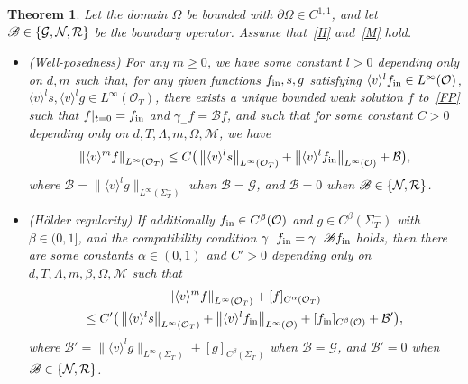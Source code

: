 \documentclass[10pt]{amsart}
\newtheorem{theo}{Theorem}[section]
\theoremstyle{definition}\newtheorem{defi}[theo]{Definition}\newtheorem{rema}[theo]{Remark}\newtheorem{exam}[theo]{Example}\newtheorem{exem}[theo]{Example}\newtheorem{nota}[theo]{Notation}
\newcommand*\p{\partial}
\newcommand*\fin {f_{\rm in}}
\newcommand*\M {{\mathcal{M}}}
\newcommand*\NN {{\mathcal{N}\hspace{-.3mm}}}
\newcommand*\Gi {\mathcal{G}}
\newcommand*\BB {\mathscr{B}}
\newcommand{\clB}{\mathcal{B}}
\newcommand*\RR {\mathcal{R}}
\newcommand*\OO {\mathcal{O}}
\newcommand{\lv}{\langle v\rangle}
\begin{document}
\begin{theo}\label{thm}
Let the domain $\Omega$ be bounded with $\p\Omega\in C^{1,1}$, and let $\BB\in\{\Gi,\NN,\RR\}$ be the boundary operator. Assume that~\eqref{H} and~\eqref{M} hold. \vspace{-2.5mm}
\begin{itemize}
\item(Well-posedness) For any $m\ge0$, we have some constant $l>0$ depending only on $d,m$ such that, for any given functions $\fin,s,g$ satisfying $\lv^l\fin\in L^\infty(\OO)$, $\lv^ls,\lv^lg\in L^\infty(\OO_T)$, there exists a unique bounded weak solution $f$ to~\eqref{FP} such that $f|_{t=0}=\fin$ and $\gamma_-f=\BB f$, and such that for some constant $C>0$ depending only on $d,T,\Lambda,m,\Omega,\M$, we have
\begin{align*}
\left\|\lv^mf\right\|_{L^\infty(\OO_T)}
\le C\big(\left\|\lv^ls\right\|_{L^\infty(\OO_T)} +
\left\|\lv^l\fin\right\|_{L^\infty(\OO)} +\clB\big),
\end{align*}
where $\clB=\|\lv^lg\|_{L^\infty(\Sigma_T^-)}$ when $\BB=\Gi$, and $\clB=0$ when $\BB\in\{\NN,\RR\}$.

\item(H\"older regularity) If additionally $\fin\in C^\beta(\OO)$ and $g\in C^\beta(\Sigma_T^-)$ with $\beta\in(0,1]$, and the compatibility condition $\gamma_-\fin=\gamma_-\BB\fin$ holds, then there are some constants $\alpha\in(0,1)$ and $C'>0$ depending only on $d,T,\Lambda,m,\beta,\Omega,\M$ such that
\begin{multline*}
\left\|\lv^mf\right\|_{L^\infty(\OO_T)}+[f]_{C^\alpha(\OO_T)}\\
\le C'\big(\left\|\lv^ls\right\|_{L^\infty(\OO_T)} +\left\|\lv^l\fin\right\|_{L^\infty(\OO)}+[\fin]_{C^\beta(\OO)} +\clB' \big),
\end{multline*}
where $\clB'=\|\lv^lg\|_{L^\infty(\Sigma_T^-)}+[g]_{C^\beta(\Sigma_T^-)}$ when $\BB=\Gi$, and $\clB'=0$ when $\BB\in\{\NN,\RR\}$.
\end{itemize}
\end{theo}
\end{document}
